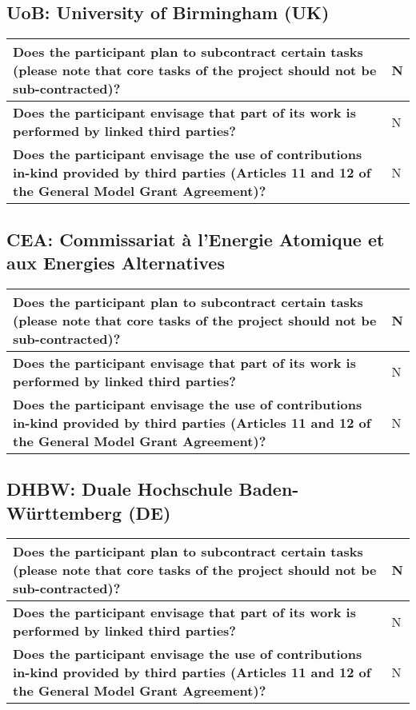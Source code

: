 \subsection{UoB: University of Birmingham (UK)}

\begin{longtable}{|p{}|p{}|}
\hline
{\bf Does the participant plan to subcontract certain tasks (please
  note that core tasks of the project should not be sub-contracted)?}
&
N
\\
\hline
{\bf Does the participant envisage that  part of its work is performed
  by linked third parties?}
&
N
\\
\hline
{\bf Does the participant envisage the use of contributions in-kind
provided by third parties (Articles 11 and 12 of the General Model
Grant Agreement)?}
&
N
\\
\hline
\end{longtable}


\subsection{CEA: Commissariat à l’Energie Atomique et aux Energies
  Alternatives}
\begin{longtable}{|p{}|p{}|}
\hline
{\bf Does the participant plan to subcontract certain tasks (please
  note that core tasks of the project should not be sub-contracted)?}
&
N
\\
\hline
{\bf Does the participant envisage that  part of its work is performed
  by linked third parties?}
&
N
\\
\hline
{\bf Does the participant envisage the use of contributions in-kind
provided by third parties (Articles 11 and 12 of the General Model
Grant Agreement)?}
&
N
\\
\hline
\end{longtable}



\subsection{DHBW: Duale Hochschule Baden-Württemberg (DE)}

\begin{longtable}{|p{}|p{}|}
\hline
{\bf Does the participant plan to subcontract certain tasks (please
  note that core tasks of the project should not be sub-contracted)?}
&
N
\\
\hline
{\bf Does the participant envisage that  part of its work is performed
  by linked third parties?}
&
N
\\
\hline
{\bf Does the participant envisage the use of contributions in-kind
provided by third parties (Articles 11 and 12 of the General Model
Grant Agreement)?}
&
N
\\
\hline
\end{longtable}


